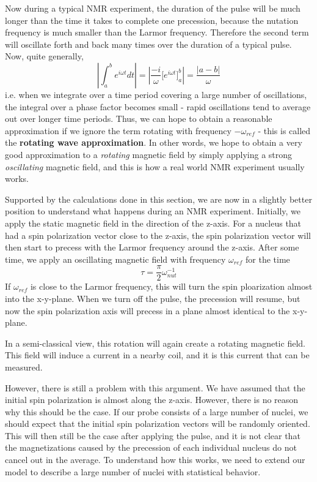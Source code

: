 \documentclass[a4paper, draft]{article}
\theoremstyle{own}
\theoremstyle{remark}
\begin{document}
Now during a typical NMR experiment, the duration of the pulse will be much longer than the time it takes to complete one precession, because the nutation frequency is much smaller than the Larmor frequency. Therefore the second term will oscillate forth and back many times over the duration of a typical pulse. Now, quite generally, 
$$
| \int_a^b e^{i\omega t} dt | = | \frac{-i}{\omega } \big[ e^{i\omega t} \big]_a^b | = \frac{|a-b|}{\omega}
$$
i.e. when we integrate over a time period covering a large number of oscillations, the integral over a phase factor becomes small - rapid oscillations tend to average out over longer time periods. Thus, we can hope to obtain a reasonable approximation if we ignore the term rotating with frequency $-\omega_{ref}$ - this is called the {\bf rotating wave approximation}. In other words, we hope to obtain a very good approximation to a \emph{rotating} magnetic field by simply applying a strong \emph{oscillating} magnetic field, and this is how a real world NMR experiment usually works. 

Supported by the calculations done in this section, we are now in a slightly better position to understand what happens during an NMR experiment. Initially, we apply the static magnetic field in the direction of the z-axis. For a nucleus that had a spin polarization vector close to the z-axis, the spin polarization vector will then start to precess with the Larmor frequency around the z-axis. After some time, we apply an oscillating magnetic field with frequency $\omega_{ref}$ for the time
$$
\tau = \frac{\pi}{2} \omega_{nut}^{-1}
$$
If $\omega_{ref}$ is close to the Larmor frequency, this will turn the spin ploarization almost into the x-y-plane. When we turn off the pulse, the precession will resume, but now the spin polarization axis will precess in a plane almost identical to the x-y-plane.  

In a semi-classical view, this rotation will again create a rotating magnetic field. This field will induce a current in a nearby coil, and it is this current that can be measured.

However, there is still a problem with this argument. We have assumed that the initial spin polarization is almost along the z-axis. However, there is no reason why this should be the case. If our probe consists of a large number of nuclei, we should expect that the initial spin polarization vectors will be randomly oriented. This will then still be the case after applying the pulse, and it is not clear that the magnetizations caused by the precession of each individual nucleus do not cancel out in the average. To understand how this works, we need to extend our model to describe a large number of nuclei with statistical behavior.
\end{document}

